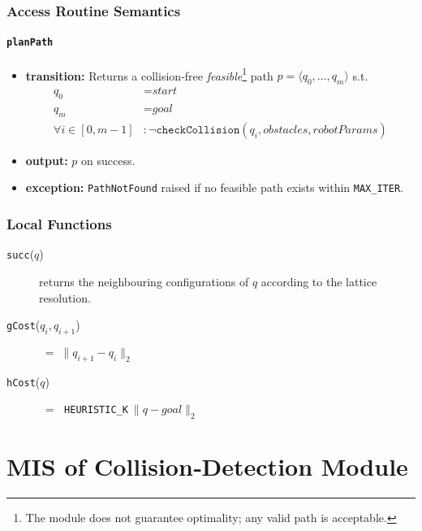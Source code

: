 \documentclass[12pt, titlepage]{article}
\begin{document}
\subsubsection{Access Routine Semantics}

\paragraph{\texttt{planPath}}
\begin{itemize}
  \item \textbf{transition:} Returns a collision‑free \emph{feasible}\footnote{The module does not guarantee optimality; any valid path is acceptable.} path $p = \langle q_0,\dots,q_m\rangle$ s.t.
        \begin{align*}
          q_0 &= \textit{start}\\
          q_m &= \textit{goal}\\
          \forall i \in [0,m-1] &: \neg\texttt{checkCollision}(q_i,\textit{obstacles},\textit{robotParams})
        \end{align*}
  \item \textbf{output:} $p$ on success.
  \item \textbf{exception:} \texttt{PathNotFound} raised if no feasible path exists within \texttt{MAX\_ITER}.
\end{itemize}

\subsubsection{Local Functions}
\begin{description}
  \item[\texttt{succ}($q$)]  returns the neighbouring configurations of $q$ according to the lattice resolution.
  \item[\texttt{gCost}($q_i,q_{i+1}$)] $\;=\; \|q_{i+1}-q_i\|_2$
  \item[\texttt{hCost}($q$)] $\;=\;$ \texttt{HEURISTIC\_K}$\:\|q-\textit{goal}\|_2$
\end{description}

\newpage




\section{MIS of Collision‑Detection Module}
\label{mod:collision}
\end{document}

